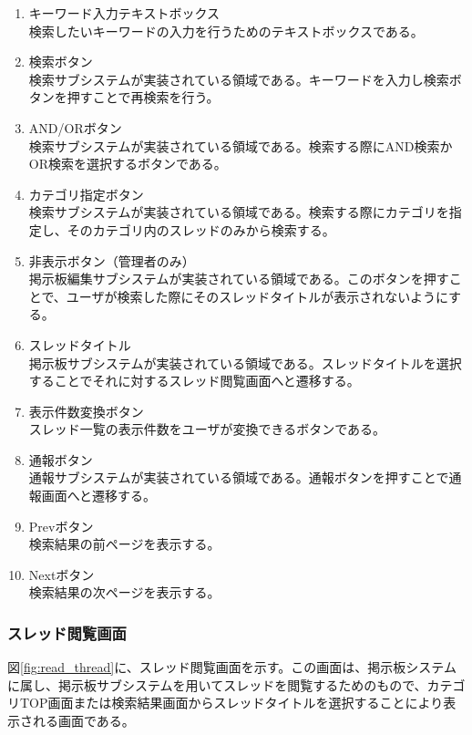 \documentclass[a4j]{jarticle}
\begin{document}
\begin{enumerate}
  \renewcommand{\labelenumi}{\textcircled{\scriptsize \theenumi}}

\item キーワード入力テキストボックス\\
検索したいキーワードの入力を行うためのテキストボックスである。
\item 検索ボタン\\
検索サブシステムが実装されている領域である。キーワードを入力し検索ボタンを押すことで再検索を行う。
\item AND/ORボタン\\
検索サブシステムが実装されている領域である。検索する際にAND検索かOR検索を選択するボタンである。
\item カテゴリ指定ボタン\\
検索サブシステムが実装されている領域である。検索する際にカテゴリを指定し、そのカテゴリ内のスレッドのみから検索する。
\item 非表示ボタン（管理者のみ）\\
掲示板編集サブシステムが実装されている領域である。このボタンを押すことで、ユーザが検索した際にそのスレッドタイトルが表示されないようにする。
\item スレッドタイトル\\
掲示板サブシステムが実装されている領域である。スレッドタイトルを選択することでそれに対するスレッド閲覧画面へと遷移する。
\item 表示件数変換ボタン\\
スレッド一覧の表示件数をユーザが変換できるボタンである。
\item 通報ボタン\\
通報サブシステムが実装されている領域である。通報ボタンを押すことで通報画面へと遷移する。
\item Prevボタン\\
検索結果の前ページを表示する。
\item Nextボタン\\
検索結果の次ページを表示する。

\end{enumerate}

\subsubsection{スレッド閲覧画面}
図\ref{fig:read_thread}に、スレッド閲覧画面を示す。この画面は、掲示板システムに属し、掲示板サブシステムを用いてスレッドを閲覧するためのもので、カテゴリTOP画面または検索結果画面からスレッドタイトルを選択することにより表示される画面である。
\end{document}

